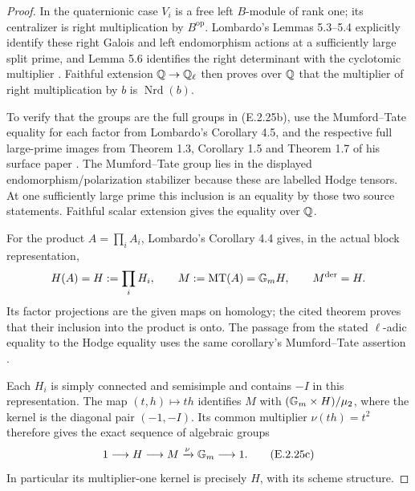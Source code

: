 \begin{proof}
In the quaternionic case \(V_i\) is a free left
\(B\)-module of rank one; its centralizer is right
multiplication by \(B^{\mathrm{op}}\). Lombardo's
Lemmas 5.3--5.4 explicitly identify these right Galois
and left endomorphism actions at a sufficiently large
split prime, and Lemma 5.6 identifies the right
determinant with the cyclotomic multiplier
\cite[Lemmas 5.3--5.6, pp.~19--20]
{GenLombardoSurfaces2015}. Faithful extension
\(\mathbb Q\to\mathbb Q_\ell\) then proves over \(\mathbb Q\) that the
multiplier of right multiplication by \(b\) is
\(\operatorname{Nrd}(b)\).

To verify that the groups are the full groups in
(E.2.25b), use the Mumford--Tate equality for each
factor from Lombardo's Corollary 4.5, and the respective
full large-prime images from Theorem 1.3, Corollary 1.5
and Theorem 1.7 of his surface paper
\cite[Theorem 1.3, p.~2; Corollary 1.5 and
Theorem 1.7, p.~3]{GenLombardoSurfaces2015}.
The Mumford--Tate group lies in the displayed
endomorphism/polarization stabilizer because these
are labelled Hodge tensors. At one sufficiently large
prime this inclusion is an equality by those two
source statements. Faithful scalar extension gives
the equality over \(\mathbb Q\).

For the product \(A=\prod_i A_i\), Lombardo's
Corollary 4.4 gives, in the actual block representation,
\[
 H(A)=H:=\prod_i H_i,\qquad
 M:=\operatorname{MT}(A)=\mathbb G_m H,
 \qquad M^{\mathrm{der}}=H.
\]
Its factor projections are the given maps on homology;
the cited theorem proves that their inclusion into
the product is onto. The passage from the stated
\(\ell\)-adic equality to the Hodge equality uses
the same corollary's Mumford--Tate assertion
\cite[Corollary 4.4, p.~12]{GenLombardoNonsimple2015}.

Each \(H_i\) is simply connected and semisimple and
contains \(-I\) in this representation. The map
\((t,h)\mapsto th\) identifies \(M\) with
\((\mathbb G_m\times H)/\mu_2\), where the kernel is the
diagonal pair \((-1,-I)\). Its common multiplier
\(\nu(th)=t^2\) therefore gives the exact sequence
of algebraic groups
\[
 1\longrightarrow H\longrightarrow M
       \xrightarrow{\nu}\mathbb G_m\longrightarrow1.
 \tag{E.2.25c}
\]
In particular its multiplier-one kernel is precisely
\(H\), with its scheme structure.


\end{proof}
